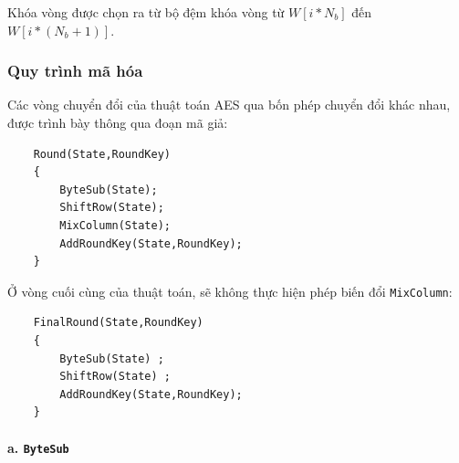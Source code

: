 Khóa vòng được chọn ra từ bộ đệm khóa vòng từ $W[i*N_b]$ đến $W[i*(N_b+1)]$. 

\subsubsection{Quy trình mã hóa}

Các vòng chuyển đổi của thuật toán AES qua bốn phép chuyển đổi khác nhau, được trình bày thông qua đoạn mã giả:
\begin{center}
	\begin{BVerbatim}
	Round(State,RoundKey)
	{
		ByteSub(State);
		ShiftRow(State);
		MixColumn(State);
		AddRoundKey(State,RoundKey);
	}
	\end{BVerbatim}

\end{center}

Ở vòng cuối cùng của thuật toán, sẽ không thực hiện phép biến đổi \texttt{MixColumn}:
\begin{center}
	\begin{BVerbatim}
	FinalRound(State,RoundKey)
	{
		ByteSub(State) ;
		ShiftRow(State) ;
		AddRoundKey(State,RoundKey);
	}
	\end{BVerbatim}
\end{center}

\paragraph{a. \texttt{ByteSub}}\quad

